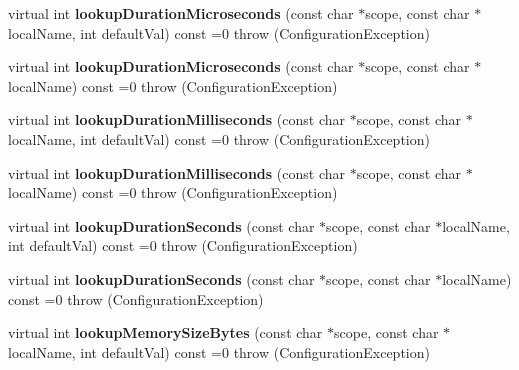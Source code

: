 \begin{DoxyCompactItemize}
\item 
\hypertarget{classCONFIG4CPP__NAMESPACE_1_1Configuration_ae765bb1acc8740a92d1ed451c210267a}{virtual int {\bfseries lookup\-Duration\-Microseconds} (const char $\ast$scope, const char $\ast$local\-Name, int default\-Val) const =0  throw (\-Configuration\-Exception)}\label{classCONFIG4CPP__NAMESPACE_1_1Configuration_ae765bb1acc8740a92d1ed451c210267a}

\item 
\hypertarget{classCONFIG4CPP__NAMESPACE_1_1Configuration_a411801a2337daf86b335cc9fa2c6d6fb}{virtual int {\bfseries lookup\-Duration\-Microseconds} (const char $\ast$scope, const char $\ast$local\-Name) const =0  throw (\-Configuration\-Exception)}\label{classCONFIG4CPP__NAMESPACE_1_1Configuration_a411801a2337daf86b335cc9fa2c6d6fb}

\item 
\hypertarget{classCONFIG4CPP__NAMESPACE_1_1Configuration_ac3f5af404012b6b1a3cfb2b177fb8b62}{virtual int {\bfseries lookup\-Duration\-Milliseconds} (const char $\ast$scope, const char $\ast$local\-Name, int default\-Val) const =0  throw (\-Configuration\-Exception)}\label{classCONFIG4CPP__NAMESPACE_1_1Configuration_ac3f5af404012b6b1a3cfb2b177fb8b62}

\item 
\hypertarget{classCONFIG4CPP__NAMESPACE_1_1Configuration_a060f220e870ad75ba029123283b7772f}{virtual int {\bfseries lookup\-Duration\-Milliseconds} (const char $\ast$scope, const char $\ast$local\-Name) const =0  throw (\-Configuration\-Exception)}\label{classCONFIG4CPP__NAMESPACE_1_1Configuration_a060f220e870ad75ba029123283b7772f}

\item 
\hypertarget{classCONFIG4CPP__NAMESPACE_1_1Configuration_a3b4815de4f40b8a75e8399f298041b8a}{virtual int {\bfseries lookup\-Duration\-Seconds} (const char $\ast$scope, const char $\ast$local\-Name, int default\-Val) const =0  throw (\-Configuration\-Exception)}\label{classCONFIG4CPP__NAMESPACE_1_1Configuration_a3b4815de4f40b8a75e8399f298041b8a}

\item 
\hypertarget{classCONFIG4CPP__NAMESPACE_1_1Configuration_af01f653956f637de24a7d3c3b24345e0}{virtual int {\bfseries lookup\-Duration\-Seconds} (const char $\ast$scope, const char $\ast$local\-Name) const =0  throw (\-Configuration\-Exception)}\label{classCONFIG4CPP__NAMESPACE_1_1Configuration_af01f653956f637de24a7d3c3b24345e0}

\item 
\hypertarget{classCONFIG4CPP__NAMESPACE_1_1Configuration_a2cf4fb9d8b7cae7a7faba0e92911ecae}{virtual int {\bfseries lookup\-Memory\-Size\-Bytes} (const char $\ast$scope, const char $\ast$local\-Name, int default\-Val) const =0  throw (\-Configuration\-Exception)}\label{classCONFIG4CPP__NAMESPACE_1_1Configuration_a2cf4fb9d8b7cae7a7faba0e92911ecae}


\end{DoxyCompactItemize}
